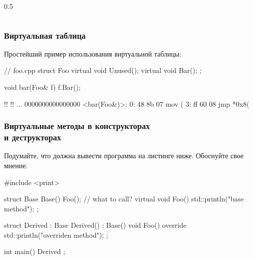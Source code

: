 \documentclass[compress, 8pt, aspectratio=169]{beamer}
\begin{document}
\begin{frame}[fragile]
\begin{columns}
\begin{column}{0.5\textwidth}
        \end{column}

    \end{columns}

\end{frame}

\begin{frame}[fragile]

    \frametitle{Виртуальная таблица}

    Простейший пример использования виртуальной таблицы:

    \begin{myinplacelisting}[minted language=cpp]
// foo.cpp
struct Foo {
    virtual void Unused();
    virtual void Bar();
};

void bar(Foo& f) {
    f.Bar();
}
    \end{myinplacelisting}

    \begin{terminalwindow}
!!
!!
...
0000000000000000 <bar(Foo&)>:
   0:   48 8b 07                mov    (%
   3:   ff 60 08                jmp    *0x8(%
    \end{terminalwindow}

\end{frame}

\begin{frame}[fragile]

    \frametitle{Виртуальные методы в конструкторах \\ и деструкторах}

    \begin{task}
        Подумайте, что должна вывести программа на листинге ниже.
        Обоснуйте свое мнение.
    \end{task}

    \begin{myinplacelisting}[minted language=cpp]
#include <print>

struct Base {
    Base() {
        Foo(); // what to call?
    }
    virtual void Foo() { std::println("base method"); }
};

struct Derived : Base {
    Derived() : Base() {}
    void Foo() override { std::println("overriden method"); }
};

int main() {
    Derived {};
}
    \end{myinplacelisting}

\end{frame}
\end{document}
